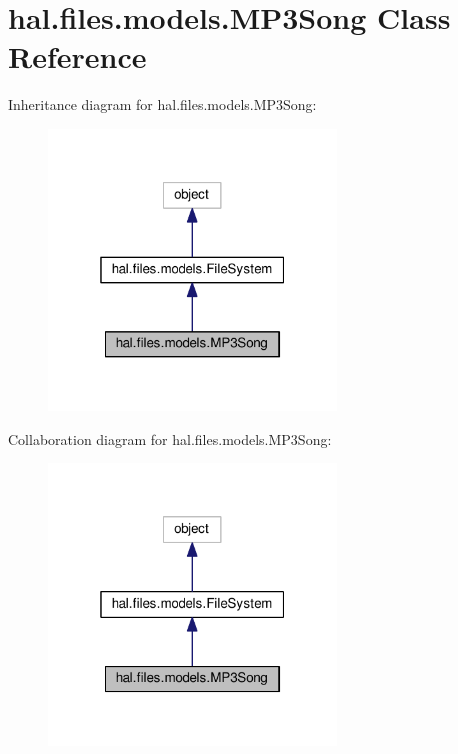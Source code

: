 \hypertarget{classhal_1_1files_1_1models_1_1_m_p3_song}{}\section{hal.\+files.\+models.\+M\+P3\+Song Class Reference}
\label{classhal_1_1files_1_1models_1_1_m_p3_song}


Inheritance diagram for hal.\+files.\+models.\+M\+P3\+Song\+:\nopagebreak
\begin{figure}[H]
\begin{center}
\leavevmode
\includegraphics[width=217pt]{classhal_1_1files_1_1models_1_1_m_p3_song__inherit__graph}
\end{center}
\end{figure}


Collaboration diagram for hal.\+files.\+models.\+M\+P3\+Song\+:\nopagebreak
\begin{figure}[H]
\begin{center}
\leavevmode
\includegraphics[width=217pt]{classhal_1_1files_1_1models_1_1_m_p3_song__coll__graph}
\end{center}
\end{figure}
